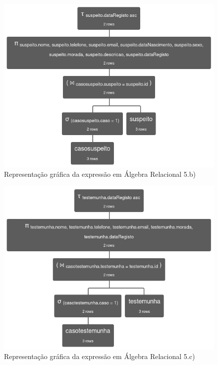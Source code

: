 \documentclass[a4paper,12pt]{scrreprt}
\begin{document}
\begin{figure}[!ht]
    \centering
    \includegraphics[scale=0.7]{images/relax/5-b.png}
    \caption{Representação gráfica da expressão em Álgebra Relacional 5.b)}
    \label{fig:4.6}
\end{figure}

\clearpage

\begin{figure}[!ht]
    \centering
    \includegraphics[scale=0.65]{images/relax/5-c.png}
    \caption{Representação gráfica da expressão em Álgebra Relacional 5.c)}
    \label{fig:4.7}
\end{figure}
\end{document}
